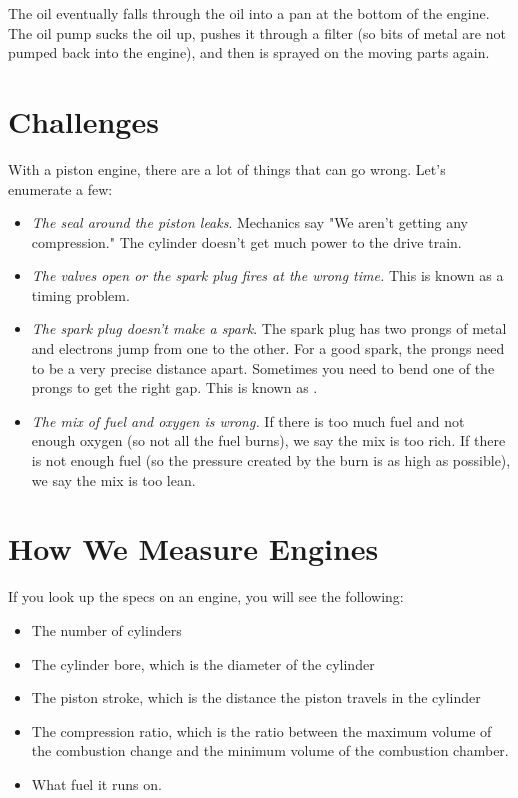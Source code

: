 The oil eventually falls through the oil into a pan at the bottom of the engine.   The oil pump sucks the oil up,  pushes it through a filter (so bits of metal are not pumped back into the engine),  and then is sprayed on the moving parts again.

\section{Challenges}

With a piston engine, there are a lot of things that can go wrong.  Let's enumerate a few:

\begin{itemize}

\item \textit{The seal around the piston leaks}.  Mechanics say "We aren't getting any compression."  The cylinder doesn't get much power to the drive train.

\item \textit{The valves open or the spark plug fires at the wrong time.}  This is known as a timing problem. 

\item \textit{The spark plug doesn't make a spark}.   The spark plug has two prongs of metal and electrons jump from one to the other.  For a good spark,  the prongs need to be a very precise distance apart.  Sometimes you need to bend one of the prongs to get the right gap.  This is known as .

\item \textit{The mix of fuel and oxygen is wrong.}  If there is too much fuel and not enough oxygen (so not all the fuel burns),  we say the mix is too rich.  If there is not enough fuel (so the pressure created by the burn is as high as possible),   we say the mix is too lean.

\end{itemize}

\section{How We Measure Engines}

If you look up the specs on an engine,  you will see the following:

\begin{itemize}
\item The number of cylinders
\item The cylinder bore, which is the diameter of the cylinder
\item The piston stroke,  which is the distance the piston travels in the cylinder
\item The compression ratio,  which is the ratio between the maximum volume of the combustion change and the minimum volume of the combustion chamber.
\item What fuel it runs on.
\end{itemize}

